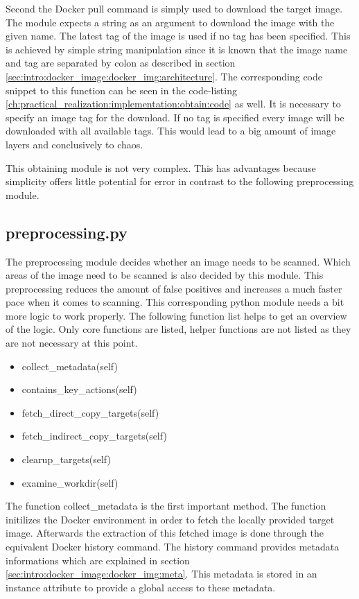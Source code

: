 Second the Docker pull command is simply used to download the target image. The module expects a string as an argument to download the image with the given name.
The latest tag of the image is used if no tag has been specified. This is achieved by simple string manipulation since it is known that the image name and tag are separated by colon as described in section \ref{sec:intro:docker_image:docker_img:architecture}.
The corresponding code snippet to this function can be seen in the code-listing \ref{ch:practical_realization:implementation:obtain:code} as well.
It is necessary to specify an image tag for the download. If no tag is specified every image will be downloaded with all available tags.
This would lead to a big amount of image layers and conclusively to chaos.

This obtaining module is not very complex. This has advantages because simplicity offers little potential for error in contrast to the following preprocessing module.

\subsection{preprocessing.py}
\label{ch:practical_realization:implementation:preprocessing}
The preprocessing module decides whether an image needs to be scanned. Which areas of the image need to be scanned is also decided by this module.
This preprocessing reduces the amount of false positives and increases a much faster pace when it comes to scanning.	
This corresponding python module needs a bit more logic to work properly. The following function list helps to get an overview of the logic. Only core functions are listed, helper functions are not listed as they are not necessary at this point.
\begin{itemize}
\item collect\_metadata(self)
\item contains\_key\_actions(self)
\item fetch\_direct\_copy\_targets(self)
\item fetch\_indirect\_copy\_targets(self)
\item clearup\_targets(self)
\item examine\_workdir(self)
\end{itemize}
The function collect\_metadata is the first important method. The function initilizes the Docker environment in order to fetch the locally provided target image. Afterwards the extraction of this fetched image is done through the equivalent Docker history command. The history command provides metadata informations which are explained in section \ref{sec:intro:docker_image:docker_img:meta}. This metadata is stored in an instance attribute to provide a global access to these metadata.

